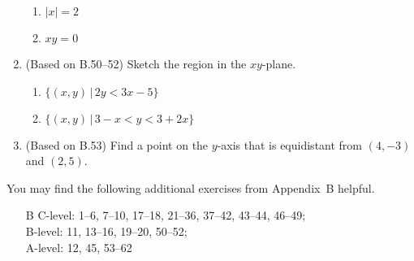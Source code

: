 \documentclass[11pt]{article}
\newcommand{\ds}{\displaystyle}
\begin{document}
\begin{enumerate}
\begin{multicols}{2}
  \begin{enumerate}
  \item $\ds |x|=2$
  \item $\ds xy=0$
  \end{enumerate}
  \end{multicols}
\item (Based on B.50--52) Sketch the region in the $xy$-plane.
  \begin{multicols}{2}
  \begin{enumerate}
  \item $\ds \{(x,y) \, | \, 2y<3x-5\}$
  \item $\ds \{(x,y) \, | \, 3-x<y<3+2x\}$
  \end{enumerate}
  \end{multicols}
\item (Based on B.53) Find a point on the $y$-axis that is equidistant from
  $(4,-3)$ and $(2,5)$.
\end{enumerate}

\noindent
You may find the following additional exercises from Appendix~B helpful.
\begin{itemize}
\item[B] 
  C-level: 1--6, 7--10, 17--18, 21--36, 37--42, 43--44, 46--49; \\
  B-level: 11, 13--16, 19--20, 50--52; \\
  A-level: 12, 45, 53--62
\end{itemize}
\end{document}
